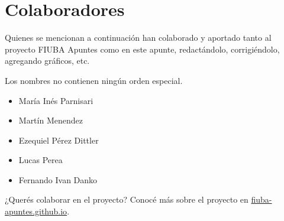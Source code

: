 \documentclass[principal.tex]{subfiles}
\begin{document}
\newpage
\section{Colaboradores}
Quienes se mencionan a continuación han colaborado y aportado tanto al proyecto FIUBA Apuntes como en este apunte, redactándolo, corrigiéndolo, agregando gráficos, etc.

Los nombres no contienen ningún orden especial. 

\begin{itemize}
\item María Inés Parnisari
\item Martín Menendez
\item Ezequiel Pérez Dittler
\item Lucas Perea
\item Fernando Ivan Danko
\end{itemize}

¿Querés colaborar en el proyecto? Conocé más sobre el proyecto en \href{http://fiuba-apuntes.github.io}{fiuba-apuntes.github.io}.
\end{document}
